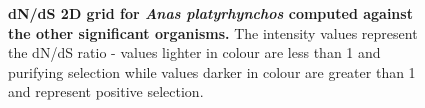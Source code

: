 \documentclass{article}
\begin{document}
\begin{figure}[H]
\centering
{}
\caption{\textbf{dN/dS 2D grid for \textit{Anas platyrhynchos} computed against the other significant organisms.} The intensity values represent the dN/dS ratio - values lighter in colour are less than 1 and purifying selection while values darker in colour are greater than 1 and represent positive selection.}
\label{sup_fig_19}
\end{figure}
\end{document}
